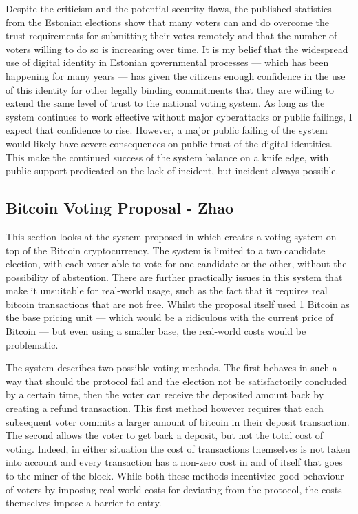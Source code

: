 Despite the criticism and the potential security flaws, the published statistics from the Estonian elections show that many voters can and do overcome the trust requirements for submitting their votes remotely and that the number of voters willing to do so is increasing over time. It is my belief that the widespread use of digital identity in Estonian governmental processes --- which has been happening for many years --- has given the citizens enough confidence in the use of this identity for other legally binding commitments that they are willing to extend the same level of trust to the national voting system. As long as the system continues to work effective without major cyberattacks or public failings, I expect that confidence to rise. However, a major public failing of the system would likely have severe consequences on public trust of the digital identities. This make the continued success of the system balance on a knife edge, with public support predicated on the lack of incident, but incident always possible.


\subsection{Bitcoin Voting Proposal - Zhao}

This section looks at the system proposed in \cite{zhaoHowVotePrivately2016} which creates a voting system on top of the Bitcoin cryptocurrency. The system is limited to a two candidate election, with each voter able to vote for one candidate or the other, without the possibility of abstention. There are further practically issues in this system that make it unsuitable for real-world usage, such as the fact that it requires real bitcoin transactions that are not free. Whilst the proposal itself used 1 Bitcoin as the base pricing unit --- which would be a ridiculous with the current price of Bitcoin --- but even using a smaller base, the real-world costs would be problematic.

The system describes two possible voting methods. The first behaves in such a way that should the protocol fail and the election not be satisfactorily concluded by a certain time, then the voter can receive the deposited amount back by creating a refund transaction. This first method however requires that each subsequent voter commits a larger amount of bitcoin in their deposit transaction. The second allows the voter to get back a deposit, but not the total cost of voting. Indeed, in either situation the cost of transactions themselves is not taken into account and every transaction has a non-zero cost in and of itself that goes to the miner of the block. While both these methods incentivize good behaviour of voters by imposing real-world costs for deviating from the protocol, the costs themselves impose a barrier to entry.

